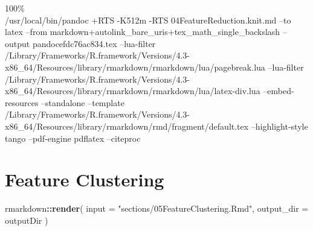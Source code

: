 \documentclass[
]{article}
\newenvironment{Shaded}{\begin{snugshade}}{\end{snugshade}}
\newcommand{\AttributeTok}[1]{\textcolor[rgb]{0.13,0.29,0.53}{#1}}
\newcommand{\FunctionTok}[1]{\textcolor[rgb]{0.13,0.29,0.53}{\textbf{#1}}}
\newcommand{\NormalTok}[1]{#1}
\newcommand{\SpecialCharTok}[1]{\textcolor[rgb]{0.81,0.36,0.00}{\textbf{#1}}}
\newcommand{\StringTok}[1]{\textcolor[rgb]{0.31,0.60,0.02}{#1}}
\begin{document}
100\%\\
/usr/local/bin/pandoc +RTS -K512m -RTS 04FeatureReduction.knit.md --to
latex --from markdown+autolink\_bare\_uris+tex\_math\_single\_backslash
--output pandocefdc76ac834.tex --lua-filter
/Library/Frameworks/R.framework/Versions/4.3-x86\_64/Resources/library/rmarkdown/rmarkdown/lua/pagebreak.lua
--lua-filter
/Library/Frameworks/R.framework/Versions/4.3-x86\_64/Resources/library/rmarkdown/rmarkdown/lua/latex-div.lua
--embed-resources --standalone --template
/Library/Frameworks/R.framework/Versions/4.3-x86\_64/Resources/library/rmarkdown/rmd/fragment/default.tex
--highlight-style tango --pdf-engine pdflatex --citeproc

\hypertarget{feature-clustering}{%
\section{Feature Clustering}\label{feature-clustering}}

\begin{Shaded}
\begin{Highlighting}[]
\NormalTok{rmarkdown}\SpecialCharTok{::}\FunctionTok{render}\NormalTok{(}
  \AttributeTok{input =} \StringTok{"sections/05FeatureClustering.Rmd"}\NormalTok{,}
  \AttributeTok{output\_dir =}\NormalTok{ outputDir}
\NormalTok{)}
\end{Highlighting}
\end{Shaded}
\end{document}
